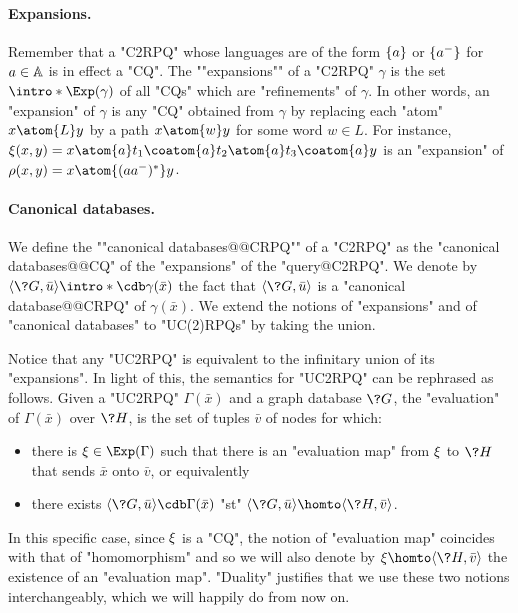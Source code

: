 \paragraph*{Expansions.}
Remember that a "C2RPQ" whose languages are
of the form $\{a\}$ or $\{a^-\}$ for $a \in \mathbb{A}$ is in effect a "CQ".
The \AP""expansions"" of a "C2RPQ" $\gamma$ is the set $\intro*\Exp(\gamma)$ of all "CQs" which are "refinements" of $\gamma$.
In other words, an "expansion" of $\gamma$ is any "CQ" obtained from $\gamma$
by replacing each "atom" $x \atom{L} y$ by a path $x \atom{w} y$ for some
word $w \in L$.
For instance, $\xi(x,y) = x \atom{a} t_1 \coatom{a} t_2 \atom{a} t_3 \coatom{a} y$
is an "expansion" of $\rho(x,y) = x \atom{(aa^-)^*} y$.

\paragraph{Canonical databases.}
We define the \AP""canonical databases@@CRPQ"" of a "C2RPQ" as the "canonical databases@@CQ"
of the "expansions" of the "query@C2RPQ". We denote by
\AP$\tup{\?G,\bar u} \intro*\cdb \gamma(\bar x)$
the fact that $\tup{\?G,\bar u}$ is a "canonical database@@CRPQ" of $\gamma(\bar x)$.
We extend the notions of "expansions" and of "canonical databases" to "UC(2)RPQs" by
taking the union.

Notice that any "UC2RPQ" is equivalent to the infinitary union of its "expansions". In light of this, the semantics for "UC2RPQ" can be rephrased as follows. 
Given a "UC2RPQ" $\Gamma(\bar x)$ and a graph database $\?G$, 
the "evaluation" of $\Gamma(\bar x)$ over $\?H$, is the set of tuples 
$\bar{v}$ of nodes for which:
\begin{itemize}
    \item there is $\anexpansion \in \Exp(\Gamma)$ such that there is an "evaluation map" from $\xi$ to $\?H$ that sends $\bar x$ onto $\bar v$, or equivalently
    \item there exists $\tup{\?G, \bar u} \cdb \Gamma(\bar x)$ "st"
    $\tup{\?G, \bar u} \homto \tup{\?H, \bar v}$.
\end{itemize}
In this specific case, since $\xi$ is a "CQ", the notion of "evaluation map"
coincides with that of "homomorphism" and so we will also
denote by $\anexpansion \homto \tup{\?H, \bar v}$ the existence of an "evaluation map".
"Duality" justifies that we use these two notions interchangeably, which we will
happily do from now on.

